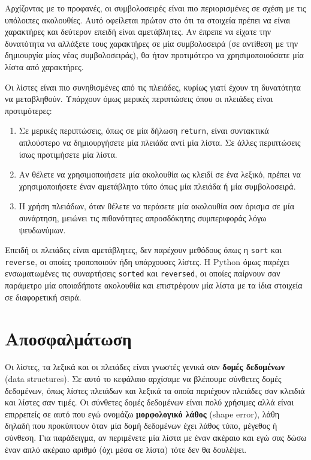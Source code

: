\documentclass[10pt]{book}
\begin{document}
Αρχίζοντας με το προφανές, οι συμβολοσειρές είναι πιο περιορισμένες σε σχέση με τις υπόλοιπες ακολουθίες. Αυτό οφείλεται πρώτον στο ότι τα στοιχεία πρέπει να είναι χαρακτήρες και δεύτερον επειδή είναι αμετάβλητες. Αν έπρεπε να είχατε την δυνατότητα να αλλάξετε τους χαρακτήρες σε μία συμβολοσειρά (σε αντίθεση με την δημιουργία μίας νέας συμβολοσειράς), θα ήταν προτιμότερο να χρησιμοποιούσατε μία λίστα από χαρακτήρες.

Οι λίστες είναι πιο συνηθισμένες από τις πλειάδες, κυρίως γιατί έχουν τη δυνατότητα να μεταβληθούν. Υπάρχουν όμως μερικές περιπτώσεις όπου οι πλειάδες είναι προτιμότερες:

\begin{enumerate}

\item  Σε μερικές περιπτώσεις, όπως σε μία δήλωση {\tt return}, είναι συντακτικά απλούστερο να δημιουργήσετε μία πλειάδα αντί μία λίστα. Σε άλλες περιπτώσεις ίσως προτιμήσετε μία λίστα.

\item  Αν θέλετε να χρησιμοποιήσετε μία ακολουθία ως κλειδί σε ένα λεξικό, πρέπει να χρησιμοποιήσετε έναν αμετάβλητο τύπο όπως μία πλειάδα ή μία συμβολοσειρά. 

\item  Η χρήση πλειάδων, όταν θέλετε να περάσετε μία ακολουθία σαν όρισμα σε μία συνάρτηση, μειώνει τις πιθανότητες απροσδόκητης συμπεριφοράς λόγω ψευδωνύμων.

\end{enumerate}

Επειδή οι πλειάδες είναι αμετάβλητες, δεν παρέχουν μεθόδους όπως η  {\tt sort}  και {\tt reverse}, οι οποίες τροποποιούν ήδη υπάρχουσες λίστες. Η Python όμως παρέχει ενσωματωμένες τις συναρτήσεις {\tt sorted} και {\tt reversed}, οι οποίες παίρνουν σαν παράμετρο μία οποιαδήποτε ακολουθία και επιστρέφουν μία λίστα με τα ίδια στοιχεία σε διαφορετική σειρά.
 


\section{Αποσφαλμάτωση}

Οι λίστες, τα λεξικά και οι πλειάδες είναι γνωστές γενικά σαν {\bf δομές δεδομένων} (data structures). Σε αυτό το κεφάλαιο αρχίσαμε να βλέπουμε σύνθετες δομές δεδομένων, όπως λίστες πλειάδων και λεξικά τα οποία περιέχουν πλειάδες σαν κλειδιά και λίστες σαν τιμές. Οι σύνθετες δομές δεδομένων είναι πολύ χρήσιμες αλλά είναι επιρρεπείς σε αυτό που εγώ ονομάζω {\bf μορφολογικό λάθος} (shape error), λάθη δηλαδή που προκύπτουν όταν μία δομή δεδομένων έχει λάθος τύπο, μέγεθος ή σύνθεση. Για παράδειγμα, αν περιμένετε μία λίστα με έναν ακέραιο και εγώ σας δώσω έναν απλό ακέραιο αριθμό (όχι μέσα σε λίστα) τότε δεν θα δουλέψει.
\end{document}
